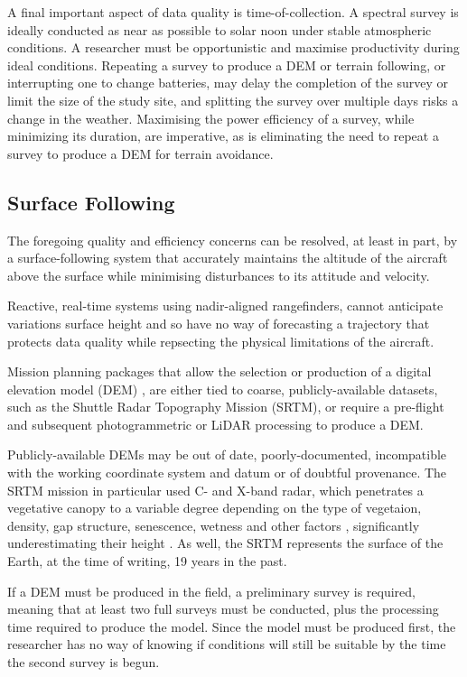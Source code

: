 \documentclass[doc]{apa6}
\begin{document}
A final important aspect of data quality is time-of-collection. A spectral survey is ideally conducted as near as possible to solar noon under stable atmospheric conditions. A researcher must be opportunistic and maximise productivity during ideal conditions. Repeating a survey to produce a DEM or terrain following, or interrupting one to change batteries, may delay the completion of the survey or limit the size of the study site, and splitting the survey over multiple days risks a change in the weather. Maximising the power efficiency of a survey, while minimizing its duration, are imperative, as is eliminating the need to repeat a survey to produce a DEM for terrain avoidance.

\subsection{Surface Following}

The foregoing quality and efficiency concerns can be resolved, at least in part, by a surface-following system that accurately maintains the altitude of the aircraft above the surface while minimising disturbances to its attitude and velocity. 


Reactive, real-time systems using nadir-aligned rangefinders, cannot anticipate variations surface height and so have no way of forecasting a trajectory that protects data quality while repsecting the physical limitations of the aircraft.

Mission planning packages that allow the selection or production of a digital elevation model (DEM) \parencite[e.g.,][]{PrecisionHawk2018,UgCS2018,MapsMadeEasy2018}, are either tied to coarse, publicly-available datasets, such as the Shuttle Radar Topography Mission (SRTM), or require a pre-flight and subsequent photogrammetric or LiDAR processing to produce a DEM. 

Publicly-available DEMs may be out of date, poorly-documented, incompatible with the working coordinate system and datum or of doubtful provenance. The SRTM mission in particular used C- and X-band radar, which penetrates a vegetative canopy to a variable degree depending on the type of vegetaion, density, gap structure, senescence, wetness and other factors \parencite{Miliaresis2009}, significantly underestimating their height \parencite{Sexton2009}. As well, the SRTM represents the surface of the Earth, at the time of writing, 19 years in the past. 

If a DEM must be produced in the field, a preliminary survey is required, meaning that at least two full surveys must be conducted, plus the processing time required to produce the model. Since the model must be produced first, the researcher has no way of knowing if conditions will still be suitable by the time the second survey is begun. 
\end{document}
